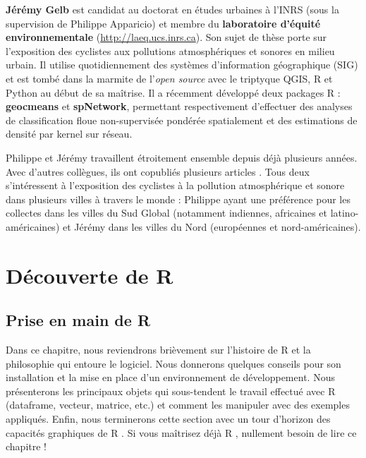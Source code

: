 \documentclass[
  11pt,
  french,
]{book}
\begin{document}
\textbf{Jérémy Gelb} est candidat au doctorat en études urbaines à l'INRS (sous la supervision de Philippe Apparicio) et membre du \textbf{laboratoire d'équité environnementale} (\url{http://laeq.ucs.inrs.ca}). Son sujet de thèse porte sur l'exposition des cyclistes aux pollutions atmosphériques et sonores en milieu urbain. Il utilise quotidiennement des systèmes d'information géographique (SIG) et est tombé dans la marmite de l'\emph{open source} avec le triptyque QGIS, R et Python au début de sa maîtrise. Il a récemment développé deux packages R : \textbf{geocmeans} et \textbf{spNetwork}, permettant respectivement d'effectuer des analyses de classification floue non-supervisée pondérée spatialement et des estimations de densité par kernel sur réseau.

Philippe et Jérémy travaillent étroitement ensemble depuis déjà plusieurs années. Avec d'autres collègues, ils ont copubliés plusieurs articles \citep{2020_1, 2020_2, 2020_3, 2019_1, 2019_2, 2019_3, 2020_1, 2020_2, 2018_1, 2017_1, 2016_1}. Tous deux s'intéressent à l'exposition des cyclistes à la pollution atmosphérique et sonore dans plusieurs villes à travers le monde : Philippe ayant une préférence pour les collectes dans les villes du Sud Global (notamment indiennes, africaines et latino-américaines) et Jérémy dans les villes du Nord (européennes et nord-américaines).

\hypertarget{part-duxe9couverte-de-r}{%
\part{Découverte de R}\label{part-duxe9couverte-de-r}}

\hypertarget{chap01}{%
\chapter{Prise en main de R}\label{chap01}}

Dans ce chapitre, nous reviendrons brièvement sur l'histoire de R et la philosophie qui entoure le logiciel. Nous donnerons quelques conseils pour son installation et la mise en place d'un environnement de développement. Nous présenterons les principaux objets qui sous-tendent le travail effectué avec R (dataframe, vecteur, matrice, etc.) et comment les manipuler avec des exemples appliqués. Enfin, nous terminerons cette section avec un tour d'horizon des capacités graphiques de R . Si vous maîtrisez déjà R , nullement besoin de lire ce chapitre !
\end{document}
